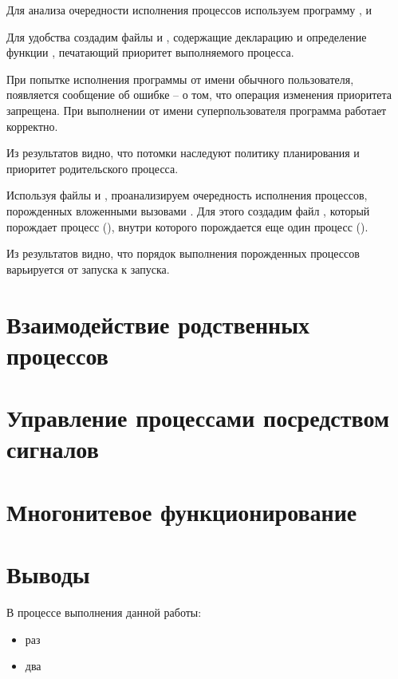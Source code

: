 Для анализа очередности исполнения процессов используем программу ,  и 







Для удобства создадим файлы  и , содержащие декларацию и определение функции , печатающий приоритет выполняемого процесса. 





При попытке исполнения программы от имени обычного пользователя, появляется сообщение об ошибке – о том, что операция изменения приоритета запрещена. При выполнении от имени суперпользователя программа работает корректно.



Из результатов видно, что потомки наследуют политику планирования и приоритет родительского процесса.

Используя файлы  и , проанализируем очередность исполнения процессов, порожденных вложенными вызовами . Для этого создадим файл , который порождает процесс (), внутри которого порождается еще один процесс ().





Из результатов видно, что порядок выполнения порожденных процессов варьируется от запуска к запуска. 

\section{Взаимодействие родственных процессов}

\section{Управление процессами посредством сигналов}

\section{Многонитевое функционирование}

\section{Выводы}

В процессе выполнения данной работы:
\begin{itemize}
	\item раз
	\item два
\end{itemize}



